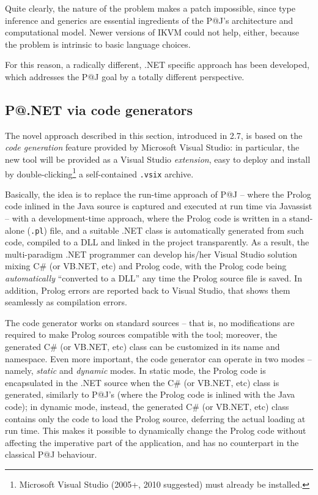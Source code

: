 Quite clearly, the nature of the problem makes a patch impossible, since type inference and generics are essential ingredients of the P@J's architecture and computational model. Newer versions of IKVM could not help, either, because the problem is intrinsic to basic language choices.

For this reason, a radically different, .NET specific approach has been developed, which addresses the P@J goal by a totally different perspective.

\subsection{P@.NET via code generators}
\label{ssec:dotnet-code-generators}

The novel approach described in this section, introduced in \tuprolog{} 2.7, is based on the \textit{code generation} feature provided by Microsoft Visual Studio: in particular, the new tool will be provided as a Visual Studio \textit{extension}, easy to deploy and install by double-clicking\footnote{Microsoft Visual Studio (2005+, 2010 suggested) must already be installed.} a self-contained \texttt{.vsix} archive.

Basically, the idea is to replace the run-time approach of P@J -- where the Prolog code inlined in the Java source is captured and executed at run time via Javassist -- with a development-time approach, where the Prolog code is written in a stand-alone (\texttt{.pl}) file, and a suitable .NET class is automatically generated from such code, compiled to a DLL and linked in the project transparently.
%
As a result, the multi-paradigm .NET programmer can develop his/her Visual Studio solution mixing C\# (or VB.NET, etc) and Prolog code, with the Prolog code being \textit{automatically} ``converted to a DLL'' any time the Prolog source file is saved.
In addition, Prolog errors are reported back to Visual Studio, that shows them seamlessly as compilation errors.

The code generator works on standard \tuprolog{} sources -- that is, no modifications are required to make Prolog sources compatible with the tool; moreover, the generated C\# (or VB.NET, etc) class can be customized in its name and namespace. Even more important, the code generator can operate in two modes -- namely, \textit{static} and \textit{dynamic} modes.
In static mode, the Prolog code is encapsulated in the .NET source when the C\# (or VB.NET, etc) class is generated, similarly to P@J's (where the Prolog code is inlined with the Java code); in dynamic mode, instead, the generated C\# (or VB.NET, etc) class contains only the code to load the Prolog source, deferring the actual loading at run time. This makes it possible to dynamically change the Prolog code without affecting the imperative part of the application, and has no counterpart in the classical P@J behaviour.

